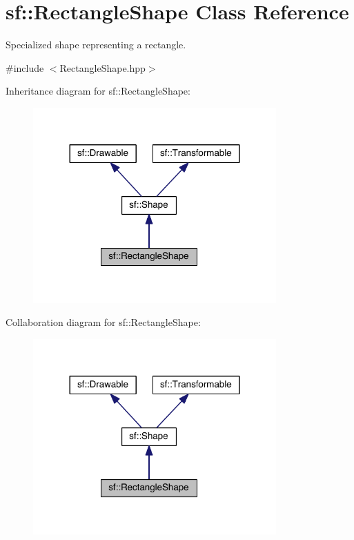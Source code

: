 \hypertarget{classsf_1_1_rectangle_shape}{\section{sf\-:\-:Rectangle\-Shape Class Reference}
\label{classsf_1_1_rectangle_shape}
}


Specialized shape representing a rectangle.  




{\ttfamily \#include $<$Rectangle\-Shape.\-hpp$>$}



Inheritance diagram for sf\-:\-:Rectangle\-Shape\-:
\nopagebreak
\begin{figure}[H]
\begin{center}
\leavevmode
\includegraphics[width=264pt]{classsf_1_1_rectangle_shape__inherit__graph}
\end{center}
\end{figure}


Collaboration diagram for sf\-:\-:Rectangle\-Shape\-:
\nopagebreak
\begin{figure}[H]
\begin{center}
\leavevmode
\includegraphics[width=264pt]{classsf_1_1_rectangle_shape__coll__graph}
\end{center}
\end{figure}
